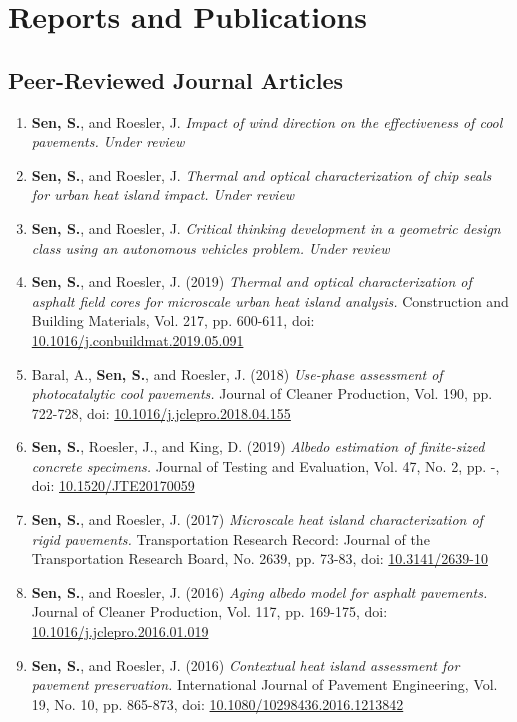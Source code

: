 \documentclass[12pt]{article}
\begin{document}
\section*{Reports and Publications}
\subsection*{Peer-Reviewed Journal Articles}
\begin{enumerate}[label=(J\arabic*)]
	\item \textbf{Sen, S.}, and Roesler, J. \textit{Impact of wind direction on the effectiveness of cool pavements.}  \textit{Under review}	
	\item \textbf{Sen, S.}, and Roesler, J. \textit{Thermal and optical characterization of chip seals for urban heat island impact.}  \textit{Under review}	
	\item \textbf{Sen, S.}, and Roesler, J. \textit{Critical thinking development in a geometric design class using an autonomous vehicles problem.}  \textit{Under review}
		\item \textbf{Sen, S.}, and Roesler, J. (2019) \textit{Thermal and optical characterization of asphalt field cores for microscale urban heat island analysis.}  Construction and Building Materials, Vol. 217, pp. 600-611, doi: \href{https://doi.org/10.1016/j.conbuildmat.2019.05.091}{10.1016/j.conbuildmat.2019.05.091}
	\item Baral, A., \textbf{Sen, S.}, and Roesler, J. (2018) \textit{Use-phase assessment of photocatalytic cool pavements.}  Journal of Cleaner Production, Vol. 190, pp. 722-728, doi: \href{https://doi.org/10.1016/j.jclepro.2018.04.155}{10.1016/j.jclepro.2018.04.155}
	\item \textbf{Sen, S.}, Roesler, J., and King, D. (2019) \textit{Albedo estimation of finite-sized concrete specimens.} Journal of Testing and Evaluation, Vol. 47, No. 2, pp. -, doi: \href{https://doi.org/10.1520/JTE20170059}{10.1520/JTE20170059}
	\item \textbf{Sen, S.}, and Roesler, J. (2017) \textit{Microscale heat island characterization of rigid pavements.} Transportation Research Record: Journal of the Transportation Research Board, No. 2639, pp. 73-83, doi: \href{http://dx.doi.org/10.3141/2639-10}{10.3141/2639-10}
	\item \textbf{Sen, S.}, and Roesler, J. (2016) \textit{Aging albedo model for asphalt pavements.} Journal of Cleaner Production, Vol. 117, pp. 169-175, doi: \href{http://dx.doi.org/10.1016/j.jclepro.2016.01.019}{10.1016/j.jclepro.2016.01.019}
	\item \textbf{Sen, S.}, and Roesler, J. (2016) \textit{Contextual heat island assessment for pavement preservation.} International Journal of Pavement Engineering, Vol. 19, No. 10, pp. 865-873, doi: \href{https://www.tandfonline.com/doi/full/10.1080/10298436.2016.1213842}{10.1080/10298436.2016.1213842}
\end{enumerate}
\end{document}
